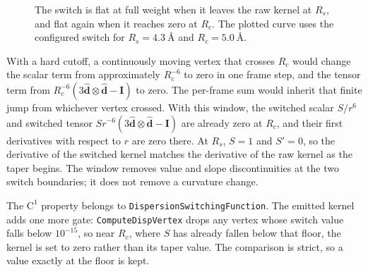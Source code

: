 \documentclass[11pt]{article}
\newcommand{\code}[1]{\texttt{#1}}
\begin{document}
\begin{figure}[ht]
\centering
{}
\caption{The switch is flat at full weight when it leaves the raw kernel at
\(R_s\), and flat again when it reaches zero at \(R_c\). The plotted curve uses
the configured switch for \(R_s=\SI{4.3}{\angstrom}\) and
\(R_c=\SI{5.0}{\angstrom}\).}
\end{figure}

With a hard cutoff, a continuously moving vertex that crosses \(R_c\) would
change the scalar term from approximately \(R_c^{-6}\) to zero in one frame
step, and the tensor term from
\(R_c^{-6}(3\hat{\bm d}\otimes\hat{\bm d}-\bm I)\) to zero. The per-frame sum
would inherit that finite jump from whichever vertex crossed. With this
window, the switched scalar \(S/r^6\) and switched tensor
\(S r^{-6}(3\hat{\bm d}\otimes\hat{\bm d}-\bm I)\) are already zero at
\(R_c\), and their first derivatives with respect to \(r\) are zero there. At
\(R_s\), \(S=1\) and \(S'=0\), so the derivative of the switched kernel matches
the derivative of the raw kernel as the taper begins. The window removes value
and slope discontinuities at the two switch boundaries; it does not remove a
curvature change.

The \(\mathrm C^1\) property belongs to \code{DispersionSwitchingFunction}.
The emitted kernel adds one more gate: \code{ComputeDispVertex} drops any
vertex whose switch value falls below \(10^{-15}\), so near \(R_c\), where
\(S\) has already fallen below that floor, the kernel is set to zero
rather than its taper value. The comparison is strict, so a value exactly at
the floor is kept.
\end{document}
